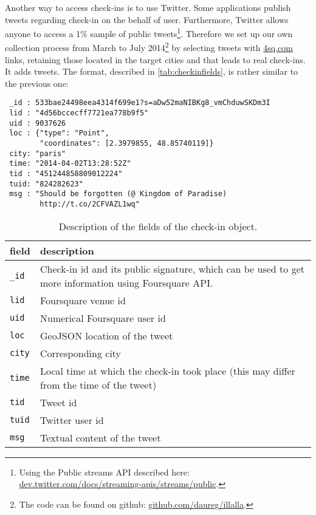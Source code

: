 Another way to access check-ins is to use Twitter. Some applications publish
tweets regarding check-in on the behalf of user. Furthermore, Twitter allows
anyone to access a 1\% sample of public tweets\footnote{Using the Public
streams API described here:
\href{https://dev.twitter.com/docs/streaming-apis/streams/public}%
{\url{dev.twitter.com/docs/streaming-apis/streams/public}}.}.
 Therefore we set up our own
collection process from March to July 2014\footnote{The code can be found on
github: \href{https://github.com/daureg/illalla}%
{\url{github.com/daureg/illalla}}.} by selecting tweets with
\url{4sq.com} links, retaining those located in the target cities and that
leads to real check-ins. It adds  tweets. The format,
described in \autoref{tab:checkinfields}, is rather similar to the previous
one:

\begin{verbatim}
 _id : 533bae24498eea4314f699e1?s=aDw52maNIBKg8_vmChduwSKDm3I
 lid : "4d56bccecff7721ea778b9f5"
 uid : 9037626
 loc : {"type": "Point",
        "coordinates": [2.3979855, 48.85740119]}
 city: "paris"
 time: "2014-04-02T13:28:52Z"
 tid : "451244858809012224"
 tuid: "824282623"
 msg : "Should be forgotten (@ Kingdom of Paradise)
        http://t.co/2CFVAZL1wq"
\end{verbatim}

\begin{table}[ht]
    \centering
    \begin{tabularx}{\textwidth}{lX}
        \toprule
        field & description \\
        \midrule
        \texttt{\_id} & Check-in id and its public signature, which can be used
        to get more information using Foursquare API. \\
        \texttt{lid} & Foursquare venue id \\
        \texttt{uid} & Numerical Foursquare user id \\
        \texttt{loc} & GeoJSON location of the tweet \\
        \texttt{city} & Corresponding city \\
        \texttt{time} & Local time at which the check-in took place (this may differ from the time of the tweet) \\
        \texttt{tid} & Tweet id \\
        \texttt{tuid} & Twitter user id \\
        \texttt{msg} & Textual content of the tweet \\
        \bottomrule
    \end{tabularx}
    \caption[Check-in format]{Description of the fields of the check-in
    object.\label{tab:checkinfields}}
\end{table}

